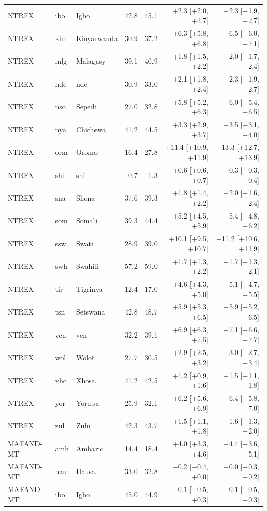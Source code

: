{\begin{longtable}{@{}lllrrrr@{}}
NTREX & ibo & Igbo & 42.8 & 45.1 & +2.3 [+2.0, +2.7] & +2.3 [+1.9, +2.7] \\
NTREX & kin & Kinyarwanda & 30.9 & 37.2 & +6.3 [+5.8, +6.8] & +6.5 [+6.0, +7.1] \\
NTREX & mlg & Malagasy & 39.1 & 40.9 & +1.8 [+1.5, +2.2] & +2.0 [+1.7, +2.4] \\
NTREX & nde & nde & 30.9 & 33.0 & +2.1 [+1.8, +2.4] & +2.3 [+1.9, +2.7] \\
NTREX & nso & Sepedi & 27.0 & 32.8 & +5.8 [+5.2, +6.3] & +6.0 [+5.4, +6.5] \\
NTREX & nya & Chichewa & 41.2 & 44.5 & +3.3 [+2.9, +3.7] & +3.5 [+3.1, +4.0] \\
NTREX & orm & Oromo & 16.4 & 27.8 & +11.4 [+10.9, +11.9] & +13.3 [+12.7, +13.9] \\
NTREX & shi & shi & 0.7 & 1.3 & +0.6 [+0.6, +0.7] & +0.3 [+0.3, +0.4] \\
NTREX & sna & Shona & 37.6 & 39.3 & +1.8 [+1.4, +2.2] & +2.0 [+1.6, +2.4] \\
NTREX & som & Somali & 39.3 & 44.4 & +5.2 [+4.5, +5.9] & +5.4 [+4.8, +6.2] \\
NTREX & ssw & Swati & 28.9 & 39.0 & +10.1 [+9.5, +10.7] & +11.2 [+10.6, +11.9] \\
NTREX & swh & Swahili & 57.2 & 59.0 & +1.7 [+1.3, +2.2] & +1.7 [+1.3, +2.1] \\
NTREX & tir & Tigrinya & 12.4 & 17.0 & +4.6 [+4.3, +5.0] & +5.1 [+4.7, +5.5] \\
NTREX & tsn & Setswana & 42.8 & 48.7 & +5.9 [+5.3, +6.5] & +5.9 [+5.2, +6.5] \\
NTREX & ven & ven & 32.2 & 39.1 & +6.9 [+6.3, +7.5] & +7.1 [+6.6, +7.7] \\
NTREX & wol & Wolof & 27.7 & 30.5 & +2.9 [+2.5, +3.2] & +3.0 [+2.7, +3.4] \\
NTREX & xho & Xhosa & 41.2 & 42.5 & +1.2 [+0.9, +1.6] & +1.5 [+1.1, +1.8] \\
NTREX & yor & Yoruba & 25.9 & 32.1 & +6.2 [+5.6, +6.9] & +6.4 [+5.8, +7.0] \\
NTREX & zul & Zulu & 42.3 & 43.7 & +1.5 [+1.1, +1.8] & +1.6 [+1.3, +2.0] \\
MAFAND-MT & amh & Amharic & 14.4 & 18.4 & +4.0 [+3.3, +4.6] & +4.4 [+3.6, +5.1] \\
MAFAND-MT & hau & Hausa & 33.0 & 32.8 & $-$0.2 [$-$0.4, +0.0] & $-$0.0 [$-$0.3, +0.2] \\
MAFAND-MT & ibo & Igbo & 45.0 & 44.9 & $-$0.1 [$-$0.5, +0.3] & $-$0.1 [$-$0.5, +0.3] \\

\end{longtable}}
